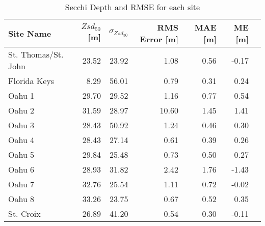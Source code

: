 \begin{table}
    \centering
    \caption{Secchi Depth and RMSE for each site}
    \label{tab:ocean_color_summary_by_site}
    \begin{tabular}{lrrrrrr}
        \toprule
        {}
        Site Name           & $Zsd_{50}$[m] & $\sigma_{Zsd_{50}}$ & RMS Error [m] & MAE [m] & ME [m] \\
        \midrule
        St. Thomas/St. John & 23.52         & 23.92               & 1.08          & 0.56    & -0.17  \\
        Florida Keys        & 8.29          & 56.01               & 0.79          & 0.31    & 0.24   \\
        Oahu 1              & 29.70         & 29.52               & 1.16          & 0.77    & 0.54   \\
        Oahu 2              & 31.59         & 28.97               & 10.60         & 1.45    & 1.41   \\
        Oahu 3              & 28.43         & 50.92               & 1.24          & 0.46    & 0.30   \\
        Oahu 4              & 28.43         & 27.14               & 0.61          & 0.39    & 0.26   \\
        Oahu 5              & 29.84         & 25.48               & 0.73          & 0.50    & 0.27   \\
        Oahu 6              & 28.93         & 31.82               & 2.42          & 1.76    & -1.43  \\
        Oahu 7              & 32.76         & 25.54               & 1.11          & 0.72    & -0.02  \\
        Oahu 8              & 33.26         & 23.75               & 0.67          & 0.52    & 0.35   \\
        St. Croix           & 26.89         & 41.20               & 0.54          & 0.30    & -0.11  \\
        \bottomrule
    \end{tabular}
\end{table}
